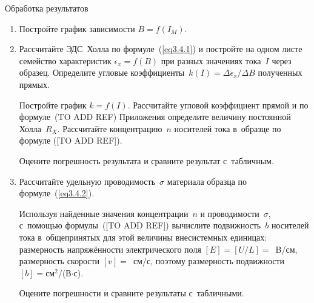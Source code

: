 {\rm Обработка результатов}
\begin{enumerate}

\item {Постройте график зависимости $B=f(I_{M})$.}

\item{ Рассчитайте ЭДС~Холла по формуле~(\ref{eq3.4.1}) и постройте на одном листе семейство характеристик $\epsilon_x=f(B)$ при разных значениях тока~$I$ через образец. Определите угловые коэффициенты~$k(I)=\Delta{\epsilon_x}/\Delta B$ полученных прямых.

Постройте график $k=f(I)$. Рассчитайте угловой коэффициент прямой и по формуле~(TO ADD REF) Приложения определите величину постоянной Холла~$R_{X}$. Рассчитайте концентрацию~$n$ носителей тока в~образце по формуле ([TO ADD REF]).

Оцените погрешность результата и сравните результат с~табличным.}


\item{ Рассчитайте удельную проводимость~$\sigma$ материала образца по формуле~(\ref{eq3.4.2}).

Используя найденные значения концентрации~$n$ и проводимости~$\sigma$, с~помощью формулы~([TO ADD REF]) вычислите подвижность~$b$ носителей тока в~общепринятых для этой величины внесистемных единицах: размерность напряжённости электрического поля $[E]=[U/L]=$~B/см, размерность скорости $[v]=$~см/с, поэтому размерность
подвижности~$[b]=$см$^2$/(В$\cdot$с).

Оцените погрешности и сравните результаты с~табличными.}
\end{enumerate}

